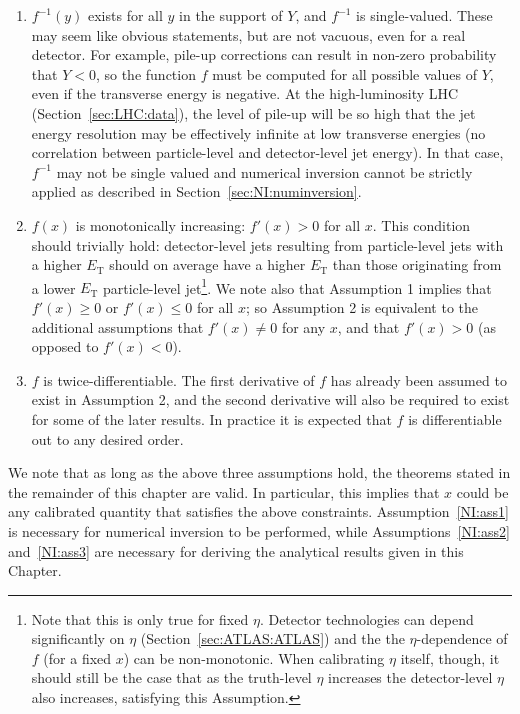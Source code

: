 \begin{enumerate}
  \item $f^{-1}(y)$ exists for all $y$ in the support of $Y$, and $f^{-1}$ is single-valued.  These may seem like obvious statements, but are not vacuous, even for a real detector.  For example, pile-up corrections can result in non-zero probability that $Y<0$, so the function $f$ must be computed for all possible values of $Y$, even if the transverse energy is negative.  At the high-luminosity LHC (Section~\ref{sec:LHC:data}), the level of pile-up will be so high that the jet energy resolution may be effectively infinite at low transverse energies (no correlation between particle-level and detector-level jet energy).  In that case, $f^{-1}$ may not be single valued and numerical inversion cannot be strictly applied as described in Section~\ref{sec:NI:numinversion}.
    \label{NI:ass1}
  \item $f(x)$ is monotonically increasing: $f'(x)>0$ for all $x$.  This condition should trivially hold: detector-level jets resulting from particle-level jets with a higher $E_\text{T}$ should on average have a higher $E_\text{T}$ than those originating from a lower $E_\text{T}$ particle-level jet\footnote{Note that this is only true for fixed $\eta$. Detector technologies can depend significantly on $\eta$ (Section~\ref{sec:ATLAS:ATLAS}) and the the $\eta$-dependence of $f$ (for a fixed $x$) can be non-monotonic. When calibrating $\eta$ itself, though, it should still be the case that as the truth-level $\eta$ increases the detector-level $\eta$ also increases, satisfying this Assumption.}. We note also that Assumption 1 implies that $f'(x)\ge 0$ or $f'(x) \le 0$ for all $x$; so Assumption 2 is equivalent to the additional assumptions that $f'(x)\ne 0$ for any $x$, and that $f'(x)>0$ (as opposed to $f'(x)<0$).
    \label{NI:ass2}
\item $f$ is twice-differentiable. The first derivative of $f$ has already been assumed to exist in Assumption 2, and the second derivative will also be required to exist for some of the later results. In practice it is expected that $f$ is differentiable out to any desired order.
    \label{NI:ass3}
\end{enumerate}

We note that as long as the above three assumptions hold, the theorems stated in the remainder of this chapter are valid.
In particular, this implies that $x$ could be any calibrated quantity that satisfies the above constraints.
Assumption~\ref{NI:ass1} is necessary for numerical inversion to be performed, while Assumptions~\ref{NI:ass2} and~\ref{NI:ass3} are necessary for deriving the analytical results given in this Chapter.

